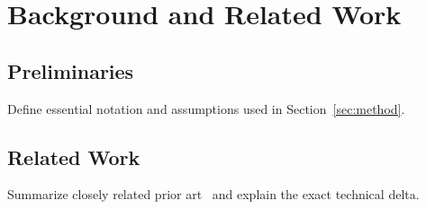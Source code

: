 \section{Background and Related Work}
\label{sec:background}


\subsection{Preliminaries}
\label{subsec:preliminaries}

Define essential notation and assumptions used in Section~\ref{sec:method}.

\subsection{Related Work}
\label{subsec:related}

Summarize closely related prior art~\cite{smith2024example} and explain the exact technical delta.

